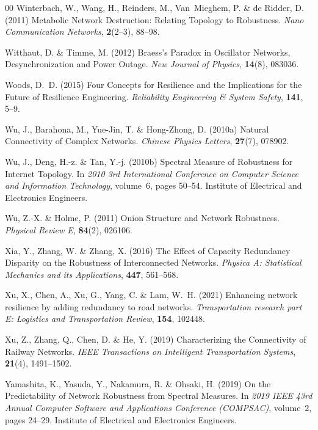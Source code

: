 \documentclass{comnet-mod}
\begin{document}
\begin{thebibliography}{00}
Winterbach, W., Wang, H., Reinders, M., Van~Mieghem, P. {\&} {de Ridder}, D.
  (2011)  {Metabolic Network Destruction: {{Relating}} Topology to Robustness}.
  {\em {Nano Communication Networks}}, \textbf{2}(2--3), 88--98.

Witthaut, D. {\&} Timme, M. (2012)  {Braess's Paradox in Oscillator Networks,
  Desynchronization and Power Outage}. {\em {New Journal of Physics}},
  \textbf{14}(8), 083036.

Woods, D.~D. (2015)  {Four Concepts for Resilience and the Implications for the
  Future of Resilience Engineering}. {\em {Reliability Engineering \& System
  Safety}}, \textbf{141}, 5--9.

Wu, J., Barahona, M., {Yue-Jin}, T. {\&} {Hong-Zhong}, D. (2010a)  {Natural
  Connectivity of Complex Networks}. {\em {Chinese Physics Letters}},
  \textbf{27}(7), 078902.

Wu, J., Deng, H.-z. {\&} Tan, Y.-j. (2010b)  {Spectral Measure of Robustness
  for {{Internet}} Topology}. In {\em {2010 3rd International Conference on
  Computer Science and Information Technology}}, volume~6, pages 50--54.
  {Institute of Electrical and Electronics Engineers}.

Wu, Z.-X. {\&} Holme, P. (2011)  {Onion Structure and Network Robustness}. {\em
  {Physical Review E}}, \textbf{84}(2), 026106.

Xia, Y., Zhang, W. {\&} Zhang, X. (2016)  {The Effect of Capacity Redundancy
  Disparity on the Robustness of Interconnected Networks}. {\em {Physica A:
  Statistical Mechanics and its Applications}}, \textbf{447}, 561--568.

Xu, X., Chen, A., Xu, G., Yang, C. {\&} Lam, W.~H. (2021)  Enhancing network
  resilience by adding redundancy to road networks. {\em {Transportation
  research part E: Logistics and Transportation Review}}, \textbf{154}, 102448.

Xu, Z., Zhang, Q., Chen, D. {\&} He, Y. (2019)  {Characterizing the
  Connectivity of Railway Networks}. {\em {IEEE Transactions on Intelligent
  Transportation Systems}}, \textbf{21}(4), 1491--1502.

Yamashita, K., Yasuda, Y., Nakamura, R. {\&} Ohsaki, H. (2019)  {On the
  Predictability of Network Robustness from Spectral Measures}. In {\em {2019
  {{IEEE}} 43rd Annual Computer Software and Applications Conference
  ({{COMPSAC}})}}, volume~2, pages 24--29. {Institute of Electrical and
  Electronics Engineers}.


\end{thebibliography}
\end{document}
